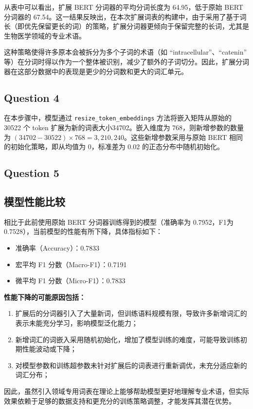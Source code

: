 \documentclass[12pt,letterpaper]{article}
\begin{document}
从表中可以看出，扩展 BERT 分词器的平均分词长度为 64.95，低于原始 BERT 分词器的 67.54。这一结果反映出，在本次扩展词表的构建中，由于采用了基于词长（即优先保留更长的词）的策略，扩展分词器更倾向于保留完整的长词，尤其是生物医学领域的专业术语。

这种策略使得许多原本会被拆分为多个子词的术语（如 ``intracellular''、``catenin'' 等）在分词时得以作为一个整体被识别，减少了额外的子词切分。因此，扩展分词器在这部分数据中的表现是更少的分词数和更大的词汇单元。


\subsection*{Question 4}

在本步骤中，模型通过 \texttt{resize\_token\_embeddings} 方法将嵌入矩阵从原始的 30522 个 token 扩展为新的词表大小34702。嵌入维度为 768，则新增参数的数量为 $(34702 - 30522) \times 768 = 3{,}210{,}240$。这些新增参数采用与原始 BERT 相同的初始化策略，即从均值为 0，标准差为 0.02 的正态分布中随机初始化。

\subsection*{Question 5}

\subsection*{模型性能比较}

相比于此前使用原始 BERT 分词器训练得到的模型（准确率为 0.7952，F1为 0.7528），当前模型的性能有所下降，具体指标如下：

\begin{itemize}
	\item 准确率（Accuracy）：0.7833
	\item 宏平均 F1 分数（Macro-F1）：0.7191
	\item 微平均 F1 分数（Micro-F1）：0.7833
\end{itemize}

\textbf{性能下降的可能原因包括：}
\begin{enumerate}
	\item 扩展后的分词器引入了大量新词，但训练语料规模有限，导致许多新增词汇的表示未能充分学习，影响模型泛化能力；
	\item 新增词汇的词嵌入采用随机初始化，增加了模型训练的难度，可能导致训练初期性能波动或下降；
	\item 对模型参数和训练超参数未针对扩展后的词表进行重新调优，未充分适应新的词汇分布；
\end{enumerate}

因此，虽然引入领域专用词表在理论上能够帮助模型更好地理解专业术语，但实际效果依赖于足够的数据支持和更充分的训练策略调整，才能发挥其潜在优势。
\end{document}
